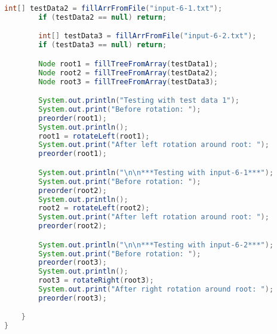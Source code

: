 \documentclass[11pt]{article}
\begin{document}
\begin{lstlisting}[language=Java]
        int[] testData2 = fillArrFromFile("input-6-1.txt");
        if (testData2 == null) return;

        int[] testData3 = fillArrFromFile("input-6-2.txt");
        if (testData3 == null) return;

        Node root1 = fillTreeFromArray(testData1);
        Node root2 = fillTreeFromArray(testData2);
        Node root3 = fillTreeFromArray(testData3);

        System.out.println("Testing with test data 1");
        System.out.print("Before rotation: ");
        preorder(root1);
        System.out.println();
        root1 = rotateLeft(root1);
        System.out.print("After left rotation around root: ");
        preorder(root1);

        System.out.println("\n\n***Testing with input-6-1***");
        System.out.print("Before rotation: ");
        preorder(root2);
        System.out.println();
        root2 = rotateLeft(root2);
        System.out.print("After left rotation around root: ");
        preorder(root2);

        System.out.println("\n\n***Testing with input-6-2***");
        System.out.print("Before rotation: ");
        preorder(root3);
        System.out.println();
        root3 = rotateRight(root3);
        System.out.print("After right rotation around root: ");
        preorder(root3);

    }
}
\end{lstlisting}
\end{document}
